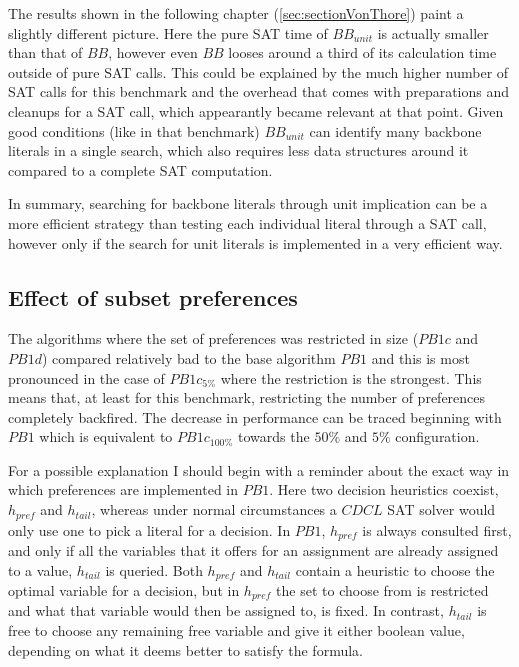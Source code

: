 The results shown in the following chapter (\ref{sec:sectionVonThore}) paint a slightly different picture. Here the pure SAT time of $BB_{unit}$ is actually smaller than that of $BB$, however even $BB$ looses around a third of its calculation time outside of pure SAT calls. This could be explained by the much higher number of SAT calls for this benchmark and the overhead that comes with preparations and cleanups for a SAT call, which appearantly became relevant at that point. Given good conditions (like in that benchmark) $BB_{unit}$ can identify many backbone literals in a single search, which also requires less data structures around it compared to a complete SAT computation.

In summary, searching for backbone literals through unit implication can be a more efficient strategy than testing each individual literal through a SAT call, however only if the search for unit literals is implemented in a very efficient way. %

\subsection{Effect of subset preferences}

The algorithms where the set of preferences was restricted in size ($PB1c$ and $PB1d$) compared relatively bad to the base algorithm $PB1$ and this is most pronounced in the case of $PB1c_{5\%}$ where the restriction is the strongest. This means that, at least for this benchmark, restricting the number of preferences completely backfired. The decrease in performance can be traced beginning with $PB1$ which is equivalent to $PB1c_{100\%}$ towards the $50\%$ and $5\%$ configuration.


For a possible explanation I should begin with a reminder about the exact way in which preferences are implemented in $PB1$. Here two decision heuristics coexist, $h_{pref}$ and $h_{tail}$, whereas under normal circumstances a $CDCL$ SAT solver would only use one to pick a literal for a decision. In $PB1$, $h_{pref}$ is always consulted first, and only if all the variables that it offers for an assignment are already assigned to a value, $h_{tail}$ is queried. Both $h_{pref}$ and $h_{tail}$ contain a heuristic to choose the optimal variable for a decision, but in $h_{pref}$ the set to choose from is restricted and what that variable would then be assigned to, is fixed. In contrast, $h_{tail}$ is free to choose any remaining free variable and give it either boolean value, depending on what it deems better to satisfy the formula.


